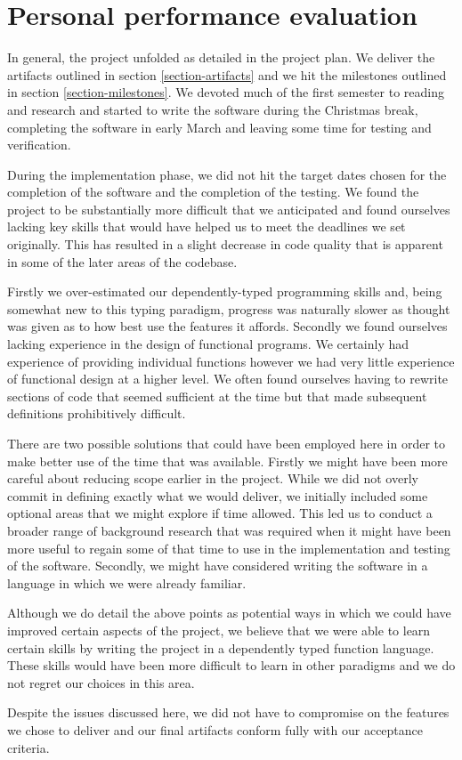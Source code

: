 \section{Personal performance evaluation}

In general, the project unfolded as detailed in the project plan. We
deliver the artifacts outlined in section \ref{section-artifacts} and we
hit the milestones outlined in section \ref{section-milestones}. We
devoted much of the first semester to reading and research and started
to write the software during the Christmas break, completing the
software in early March and leaving some time for testing and verification.

During the implementation phase, we did not hit the target
dates chosen for the completion of the software and the completion of
the testing. We found the project to be substantially more difficult
that we anticipated and found ourselves lacking key skills that would
have helped us to meet the deadlines we set originally. This has
resulted in a slight decrease in code quality that is apparent in some
of the later areas of the codebase.

Firstly we over-estimated our dependently-typed programming skills and,
being somewhat new to this typing paradigm, progress was naturally
slower as thought was given as to how best use the features it
affords. Secondly we found ourselves lacking experience in the design
of functional programs. We certainly had experience of providing
individual functions however we had very little experience of
functional design at a higher level. We often found ourselves having
to rewrite sections of code that seemed sufficient at the time but
that made subsequent definitions prohibitively difficult.

There are two possible solutions that could have been employed here in
order to make better use of the time that was available. Firstly we
might have been more careful about reducing scope earlier in the
project. While we did not overly commit in defining exactly what we
would deliver, we initially included some optional areas that we might
explore if time allowed. This led us to conduct a broader range of
background research that was required when it might have been
more useful to regain some of that time to use in the implementation
and testing of the software. Secondly, we might have considered
writing the software in a language in which we were already familiar.

Although we do detail the above points as potential ways in which we
could have improved certain aspects of the project, we believe that we
were able to learn certain skills by writing the project in a
dependently typed function language. These skills would have been more
difficult to learn in other paradigms and we do not regret our choices
in this area.

Despite the issues discussed here, we did not have to compromise on
the features we chose to deliver and our final artifacts conform fully
with our acceptance criteria.
